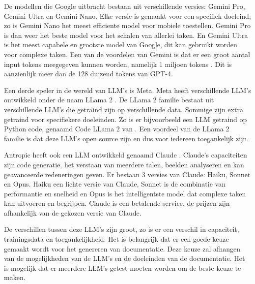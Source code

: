 De modellen die Google \autocite{Google2024} uitbracht bestaan uit verschillende versies: Gemini Pro, Gemini Ultra en Gemini Nano. 
Elke versie is gemaakt voor een specifiek doeleind, zo is Gemini Nano het meest efficiente model voor mobiele toestellen. Gemini Pro is dan weer het beste model voor het schalen van allerlei taken.
En Gemini Ultra is het meest capabele en grootste model van Google, dit kan gebruikt worden voor complexe taken.
Een van de voordelen van Gemini is dat er een groot aantal input tokens meegegeven kunnen worden, namelijk 1 miljoen tokens \autocite{Google2024}.
Dit is aanzienlijk meer dan de 128 duizend tokens van GPT-4.

Een derde speler in de wereld van LLM's is Meta. Meta heeft verschillende LLM's ontwikkeld onder de naam LLama 2 \autocite{Meta2024}.
De LLama 2 familie bestaat uit verschillende LLM's die getraind zijn op verschillende data. Sommige zijn extra getraind voor specifiekere doeleinden.
Zo is er bijvoorbeeld een LLM getraind op Python code, genaamd Code LLama 2 van \textcite{Roziere2024}.
Een voordeel van de LLama 2 familie is dat deze LLM's open source zijn en dus voor iedereen toegankelijk zijn.

Antropic heeft ook een LLM ontwikkeld genaamd Claude \autocite{Anthropic2023}. 
Claude's capaciteiten zijn code generatie, het verstaan van meerdere talen, beelden analyseren en kan geavanceerde redeneringen geven.
Er bestaan 3 versies van Claude: Haiku, Sonnet en Opus.
Haiku een lichte versie van Claude, Sonnet is de combinatie van performantie en snelheid en Opus is het intelligentste model dat complexe taken kan uitvoeren en begrijpen.
Claude is een betalende service, de prijzen zijn afhankelijk van de gekozen versie van Claude.

De verschillen tussen deze LLM's zijn groot, zo is er een verschil in capaciteit, trainingsdata en toegankelijkheid.
Het is belangrijk dat er een goede keuze gemaakt wordt voor het genereren van documentatie.
Deze keuze zal afhangen van de mogelijkheden van de LLM's en de doeleinden van de documentatie.
Het is mogelijk dat er meerdere LLM's getest moeten worden om de beste keuze te maken.

